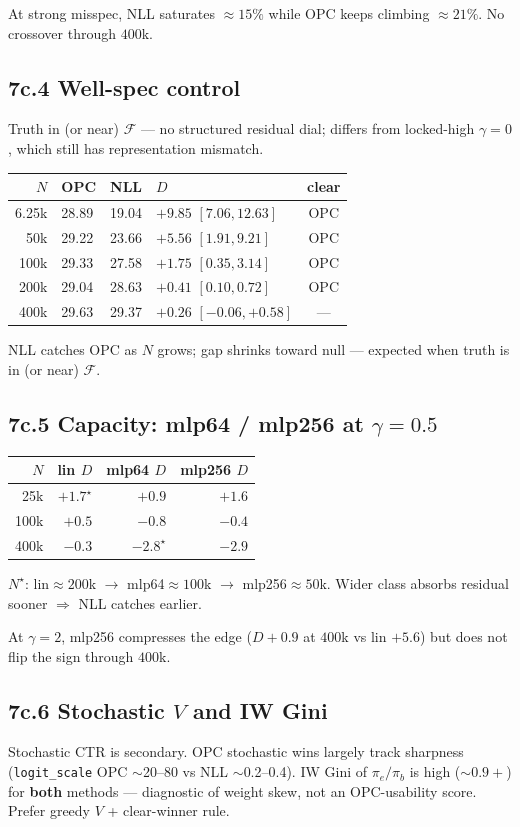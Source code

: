 \documentclass[11pt]{article}
\newcommand{\phonesub}[1]{\Needspace{6\baselineskip}\subsection*{#1}}
\begin{document}
At strong misspec, NLL saturates
$\approx 15\%$ while OPC keeps climbing
$\approx 21\%$. No crossover through $400$k.

\phonesub{7c.4 Well-spec control}
Truth in (or near) $\mathcal{F}$ --- no
structured residual dial; differs from
locked-high $\gamma{=}0$, which still has
representation mismatch.

{\scriptsize
\begin{tabular}{@{}r lll c@{}}
\toprule
$N$ & OPC & NLL & $D$ & clear \\
\midrule
6.25k & 28.89 & 19.04 & $+9.85$ $[7.06,12.63]$ & OPC \\
50k & 29.22 & 23.66 & $+5.56$ $[1.91,9.21]$ & OPC \\
100k & 29.33 & 27.58 & $+1.75$ $[0.35,3.14]$ & OPC \\
200k & 29.04 & 28.63 & $+0.41$ $[0.10,0.72]$ & OPC \\
400k & 29.63 & 29.37 & $+0.26$ $[-0.06,+0.58]$ & --- \\
\bottomrule
\end{tabular}}

NLL catches OPC as $N$ grows; gap shrinks
toward null --- expected when truth is in
(or near) $\mathcal{F}$.

\phonesub{7c.5 Capacity: mlp64 / mlp256
at $\gamma{=}0.5$}
{\scriptsize
\begin{tabular}{@{}r rrr@{}}
\toprule
$N$ & lin $D$ & mlp64 $D$ & mlp256 $D$ \\
\midrule
25k & $+1.7^{\star}$ & $+0.9$ & $+1.6$ \\
100k & $+0.5$ & $-0.8$ & $-0.4$ \\
400k & $-0.3$ & $-2.8^{\star}$ & $-2.9$ \\
\bottomrule
\end{tabular}}

$N^{\star}$: lin$\approx 200$k $\to$
mlp64$\approx 100$k $\to$ mlp256$\approx 50$k.
Wider class absorbs residual sooner $\Rightarrow$
NLL catches earlier.

At $\gamma{=}2$, mlp256 compresses the edge
($D{+}0.9$ at $400$k vs lin $+5.6$) but does
not flip the sign through $400$k.

\phonesub{7c.6 Stochastic $V$ and IW Gini}
Stochastic CTR is secondary. OPC stochastic
wins largely track sharpness
(\texttt{logit\_scale} OPC $\sim$20--80 vs
NLL $\sim$0.2--0.4). IW Gini of
$\pi_e/\pi_b$ is high ($\sim 0.9+$) for
\textbf{both} methods --- diagnostic of
weight skew, not an OPC-usability score.
Prefer greedy $V$ + clear-winner rule.
\end{document}

